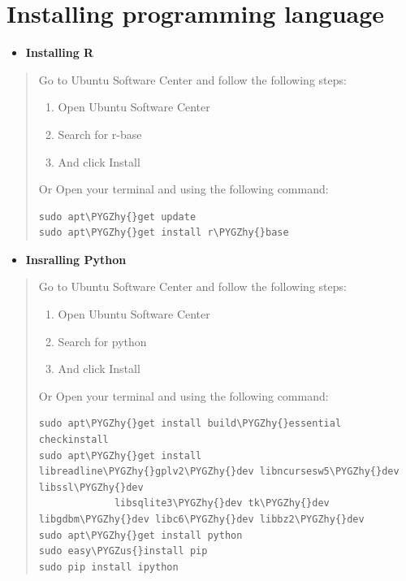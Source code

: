 \documentclass[letterpaper,11pt,english]{sphinxmanual}
\def\PYGZus{\char`\_}
\def\PYGZhy{\char`\-}
\begin{document}
\section{Installing programming language}
\label{gettingstarted:installing-programming-language}\label{gettingstarted:index-0}\begin{itemize}
\item {} 
\textbf{Installing R}

\end{itemize}
\begin{quote}

Go to Ubuntu Software Center and follow the following steps:
\begin{enumerate}
\item {} 
Open Ubuntu Software Center

\item {} 
Search for r-base

\item {} 
And click Install

\end{enumerate}

Or Open your terminal and  using the following command:

\begin{Verbatim}[commandchars=\\\{\}]
sudo apt\PYGZhy{}get update
sudo apt\PYGZhy{}get install r\PYGZhy{}base
\end{Verbatim}
\end{quote}
\begin{itemize}
\item {} 
\textbf{Insralling Python}

\end{itemize}
\begin{quote}

Go to Ubuntu Software Center and follow the following steps:
\begin{enumerate}
\item {} 
Open Ubuntu Software Center

\item {} 
Search for python

\item {} 
And click Install

\end{enumerate}

Or Open your terminal and  using the following command:

\begin{Verbatim}[commandchars=\\\{\}]
sudo apt\PYGZhy{}get install build\PYGZhy{}essential checkinstall
sudo apt\PYGZhy{}get install libreadline\PYGZhy{}gplv2\PYGZhy{}dev libncursesw5\PYGZhy{}dev libssl\PYGZhy{}dev
             libsqlite3\PYGZhy{}dev tk\PYGZhy{}dev libgdbm\PYGZhy{}dev libc6\PYGZhy{}dev libbz2\PYGZhy{}dev
sudo apt\PYGZhy{}get install python
sudo easy\PYGZus{}install pip
sudo pip install ipython
\end{Verbatim}
\end{quote}
\end{document}
